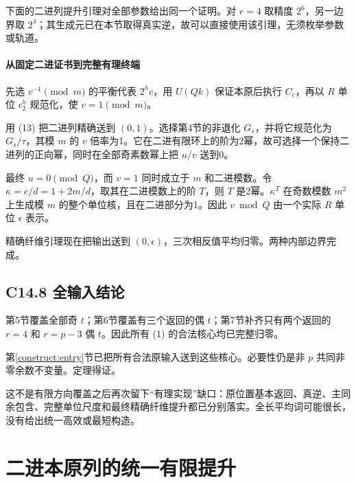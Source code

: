 {下面的二进列提升引理对全部参数给出同一个证明。对} \(r=4\) {取精度} \(2^6\){，另一边界取} \(2^4\){；其生成元已在本节取得真实逆，故可以直接使用该引理，无须枚举参数或轨道。}

\paragraph*{\texorpdfstring{{从固定二进证书到完整有理终端}}{从固定二进证书到完整有理终端}}\label{C14-h105}

{先选} \(v^{-1}\pmod m\) {的平衡代表} \(2^h c\){，用} \(U(Qk)\) {保证本原后执行} \(C_c\){，再以} \(R\) {单位} \(\epsilon_2^h\) {规范化，使} \(v=1\pmod m\){。}

{用} {(13)} {把二进列精确送到} \((0,1)\){。选择第4节的非退化} \(G_s\){，并将它规范化为} \(G_s/\tau\){，其模} \(m\) {的} \(v\) {倍率为1。它在二进有限环上的阶为2幂，故可选择一个保持二进列的正向幂，同时在全部奇素数幂上把} \(u/v\) {送到0。}

{最终} \(u=0\pmod Q\){，而} \(v=1\) {同时成立于} \(m\) {和二进模数。令} \(\kappa=e/d=1+2m/d\){，取其在二进模数上的阶} \(T\){，则} \(T\) {是2幂。}\(\kappa^T\) {在奇数模数} \(m^2\) {上生成模} \(m\) {的整个单位核，且在二进部分为1。因此} \(v\bmod Q\) {由一个实际} \(R\) {单位} \(\epsilon\) {表示。}

{精确纤维引理现在把输出送到} \((0,\epsilon)\){，三次相反值平均归零。两种内部边界完成。}

\subsection*{\texorpdfstring{{C14.8} {全输入结论}}{C14.8 全输入结论}}\label{C14-h106}

{第5节覆盖全部奇} \(t\){；第6节覆盖有三个返回的偶} \(t\){；第7节补齐只有两个返回的} \(r=4\) {和} \(r=p-3\) {偶} \(t\){。因此所有} {(1)} {的合法核心均已完整归零。}

第\ref{construct:entry}节{已把所有合法原输入送到这些核心。必要性仍是非} \(p\) {共同非零余数不变量。定理得证。}

{这不是有限方向覆盖之后再次留下``有理实现''缺口：原位置基本返回、真逆、主同余包含、完整单位尺度和最终精确纤维提升都已分别落实。全长平均词可能很长，没有给出统一高效或最短构造。}


\section{二进本原列的统一有限提升}\label{construct:dyadic}
